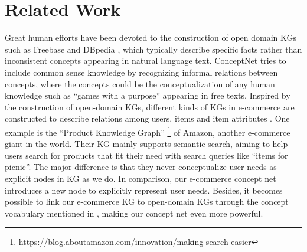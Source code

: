 \section{Related Work}
\label{sec:related}



Great human efforts have been devoted to the construction of open domain KGs such as Freebase \cite{bollacker2008freebase} and DBpedia \cite{auer2007dbpedia}, 
which typically describe specific facts rather than inconsistent concepts appearing in natural language text. 
ConceptNet \cite{speer2012representing} tries to include common sense knowledge by recognizing informal relations between concepts, where the concepts could be the conceptualization of any human knowledge such as ``games with a purpose'' appearing in free texts.
Inspired by the construction of open-domain KGs, different kinds of KGs in e-commerce are constructed
to describe relations among users, items and item attributes \cite{catherine2017explainable,ai2018learning}.
One example is the ``Product Knowledge Graph'' \footnote{\url{https://blog.aboutamazon.com/innovation/making-search-easier}} of Amazon, another e-commerce giant in the world. Their KG mainly supports semantic search, aiming to help users search for products that fit their need with search queries like ``items for picnic''. The major difference is that they never conceptualize user needs as explicit nodes in KG as we do.
In comparison, our e-commerce concept net introduces a new node to explicitly represent user needs. Besides, it becomes possible to link our e-commerce KG to open-domain KGs through the concept vocabulary mentioned in , making our concept net even more powerful.

